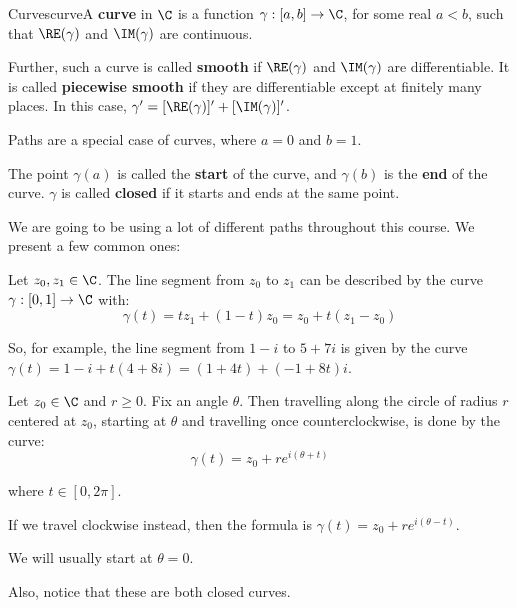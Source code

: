 \begin{defbo}{Curves}{curve}A {\bf curve} in $\C$ is a function $\gamma:[a,b] \rightarrow \C$, for some real $a < b$, such that $\RE(\gamma)$ and $\IM(\gamma)$ are continuous.

\vspace{5pt}

Further, such a curve is called {\bf smooth} if $\RE(\gamma)$ and $\IM(\gamma)$ are differentiable. It is called {\bf piecewise smooth} if they are differentiable except at finitely many places. In this case, $\gamma' = [\RE(\gamma)]' + [\IM(\gamma)]'$.

\vspace{5pt}

Paths are a special case of curves, where $a = 0$ and $b = 1$.

\vspace{5pt}

The point $\gamma(a)$ is called the {\bf start} of the curve, and $\gamma(b)$ is the {\bf end} of the curve. $\gamma$ is called {\bf closed} if it starts and ends at the same point.
\end{defbo}

We are going to be using a lot of different paths throughout this course. We present a few common ones:

\begin{ex}{}{} Let $z_0,z_1\in \C$. The line segment from $z_0$ to $z_1$ can be described by the curve $\gamma:[0,1]\rightarrow \C$ with:
$$\gamma(t) = tz_1 + (1-t)z_0 = z_0 + t(z_1 - z_0)$$

So, for example, the line segment from $1 - i$ to $5 + 7i$ is given by the curve $\gamma(t) = 1 - i + t(4 + 8i) = (1+4t) + (-1 + 8t)i$.
\end{ex}

\begin{ex}{}{} Let $z_0 \in \C$ and $r\ge 0$. Fix an angle $\theta$. Then travelling along the circle of radius $r$ centered at $z_0$, starting at $\theta$ and travelling once counterclockwise, is done by the curve:
$$\gamma(t) = z_0 + re^{i(\theta + t)}$$

\noin where $t\in [0,2\pi]$.

If we travel clockwise instead, then the formula is $\gamma(t) = z_0 + re^{i(\theta - t)}$.

We will usually start at $\theta= 0$.

Also, notice that these are both closed curves.
\end{ex}

